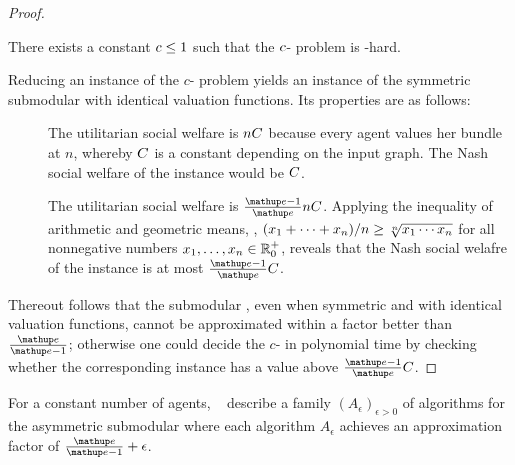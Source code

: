 \begin{proof}
	\begin{proposition}
		There exists a constant \(c \le 1\) such that the \(c\)-\Gap{} problem is \NP\kern1.5pt-hard.
	\end{proposition}
	Reducing an instance of the \(c\)-\Gap{} problem yields an instance of the symmetric submodular \USW{} with identical valuation functions.
	Its properties are as follows:
	\begin{description}
		\item[\Yes]
		The utilitarian social welfare is \(n C\) because every agent values her bundle at \(n\), whereby \(C\) is a constant depending on the input graph.
		The Nash social welfare of the instance would be \(C\).

		\item[\No]
		The utilitarian social welfare is \(\frac{\euler - 1}{\euler} n \USWconstant\).
		Applying the inequality of arithmetic and geometric means, \ie{}, \((x_1 + \dots + x_n)/n \ge \smash{\sqrt[n]{x_1 \dotsm x_n}}\) for all nonnegative numbers \(x_1, \dots, x_n \in \realposzero\), reveals that the Nash social welafre of the instance is at most \(\frac{\euler - 1}{\euler} \USWconstant\).
	\end{description}
	Thereout follows that the submodular \NSW{}, even when symmetric and with identical valuation functions, cannot be approximated within a factor better than \(\frac{\euler}{\euler - 1}\);
	otherwise one could decide the \(c\)-\Gap{} in polynomial time by checking whether the corresponding \NSW{} instance has a value above \(\frac{\euler - 1}{\euler} \USWconstant\).
\end{proof}

For a constant number of agents, \citeauthor{APNSWuSVþUM}~\cite[Section 5.1]{APNSWuSVþUM} describe a family \((A_{\epsilon})_{\epsilon > 0}\) of algorithms for the asymmetric submodular \NSW{} where each algorithm \(A_\epsilon\) achieves an approximation factor of \(\frac{\euler}{\euler - 1} + \epsilon\).

